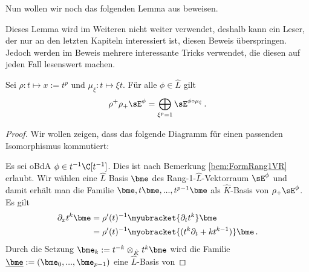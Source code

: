 Nun wollen wir noch das folgenden Lemma aus \cite[Lem
2.4]{sabbah_Fourier-local} beweisen. 
\begin{comment}
TODO: text löschen?
\end{comment}
Dieses Lemma wird im Weiteren nicht weiter verwendet, deshalb kann ein Leser,
der nur an den letzten Kapiteln interessiert ist, diesen Beweis überspringen.
Jedoch werden im Beweis mehrere interessante Tricks verwendet, die diesen auf
jeden Fall lesenswert machen.
\begin{lem}
Sei $\rho:t\mapsto x:=t^p$ und $\mu_\xi:t\mapsto\xi t$.
Für alle $\phi \in \hat L$ gilt
\[
\rho^+\rho_+\sE^\phi=\bigoplus_{\xi^p=1}\sE^{\phi\circ\mu_\xi} \,.
\]
\end{lem}
%
\begin{proof}
Wir wollen zeigen, dass das folgende Diagramm für einen passenden Isomorphismus
kommutiert:
\begin{center}
\end{center}
Es sei oBdA $\phi\in t^{-1}\C[t^{-1}]$. Dies ist nach Bemerkung 
\ref{bem:FormRang1VR} erlaubt.
Wir wählen eine $\hat L$ Basis $\bme$ des Rang-1-$\hat L$-Vektorraum $\sE^\phi$
und damit erhält man die Familie $\bme,t\bme,...,t^{p-1}\bme$ als $\hat
K$-Basis von $\rho_+\sE^\phi$.
Es gilt 
\begin{equation} \label{eq:2-4-basisAbleitung}
\begin{aligned}
\partial_xt^{k}\bme &= \rho'(t)^{-1}\myubracket{\partial_tt^{k}}\bme
\\&= \rho'(t)^{-1}\myobracket{(t^{k}\partial_t + kt^{k-1})}\bme \,.
\end{aligned}
\end{equation}
Durch die Setzung $\bme_k:=t^{-k}\otimes_{\hat K}t^k\bme$ wird die Familie
$\underline{\bme}:=(\bme_0,...,\bme_{p-1})$ eine $\hat L$-Basis von

\end{proof}
